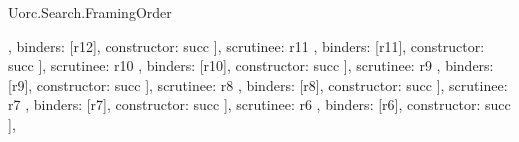 \begin{lexlean}{Uorc.Search.FramingOrder}
\begin{semanticmodule}
{{{{{{{{{{{{{{{{{{{{{{{{{{                                                                          },
                                                                          binders: [r12],
                                                                          constructor: succ
                                                                        }
                                                                      ],
                                                                      scrutinee: r11
                                                                    },
                                                                    binders: [r11],
                                                                    constructor: succ
                                                                  }
                                                                ],
                                                                scrutinee: r10
                                                              },
                                                              binders: [r10],
                                                              constructor: succ
                                                            }
                                                          ],
                                                          scrutinee: r9
                                                        },
                                                        binders: [r9],
                                                        constructor: succ
                                                      }
                                                    ],
                                                    scrutinee: r8
                                                  },
                                                  binders: [r8],
                                                  constructor: succ
                                                }
                                              ],
                                              scrutinee: r7
                                            },
                                            binders: [r7],
                                            constructor: succ
                                          }
                                        ],
                                        scrutinee: r6
                                      },
                                      binders: [r6],
                                      constructor: succ
                                    }
                                  ],
}}}}}}}}}}}}
\end{semanticmodule}
\end{lexlean}

